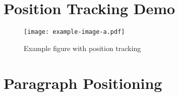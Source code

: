 \documentclass[twocolumn]{article}
\begin{document}
\section{Position Tracking Demo}
\begin{figure}[t]
  \centering
  \caption{Example figure with position tracking}
  \texttt{[image: example-image-a.pdf]}
  \label{fig:example}
\end{figure}
\lipsum[1-2]

\section{Paragraph Positioning}
\lipsum[3-7]
\end{document}
